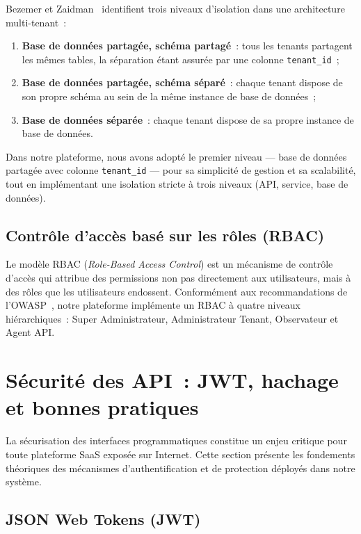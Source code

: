 Bezemer et Zaidman~\cite{bezemer2010} identifient trois niveaux d'isolation dans une architecture multi-tenant~:

\begin{enumerate}[noitemsep]
    \item \textbf{Base de données partagée, schéma partagé}~: tous les tenants partagent les mêmes tables, la séparation étant assurée par une colonne \texttt{tenant\_id}~;
    \item \textbf{Base de données partagée, schéma séparé}~: chaque tenant dispose de son propre schéma au sein de la même instance de base de données~;
    \item \textbf{Base de données séparée}~: chaque tenant dispose de sa propre instance de base de données.
\end{enumerate}

Dans notre plateforme, nous avons adopté le premier niveau --- base de données partagée avec colonne \texttt{tenant\_id} --- pour sa simplicité de gestion et sa scalabilité, tout en implémentant une isolation stricte à trois niveaux (API, service, base de données).

\subsection{Contrôle d'accès basé sur les rôles (RBAC)}

Le modèle RBAC (\textit{Role-Based Access Control}) est un mécanisme de contrôle d'accès qui attribue des permissions non pas directement aux utilisateurs, mais à des rôles que les utilisateurs endossent. Conformément aux recommandations de l'OWASP~\cite{owasp2021}, notre plateforme implémente un RBAC à quatre niveaux hiérarchiques~: Super Administrateur, Administrateur Tenant, Observateur et Agent API.


\section{Sécurité des API~: JWT, hachage et bonnes pratiques}
\label{sec:securite}

La sécurisation des interfaces programmatiques constitue un enjeu critique pour toute plateforme SaaS exposée sur Internet. Cette section présente les fondements théoriques des mécanismes d'authentification et de protection déployés dans notre système.

\subsection{JSON Web Tokens (JWT)}

